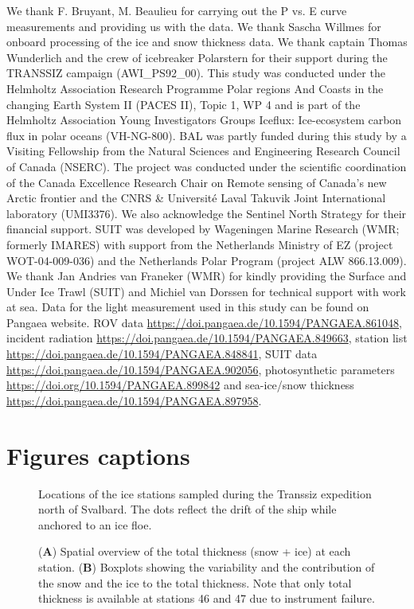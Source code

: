 \documentclass[draft]{agujournal2018}
\begin{document}
We thank F. Bruyant, M. Beaulieu for carrying out the P vs. E curve measurements and providing us with the data. We thank Sascha Willmes for onboard processing of the ice and snow thickness data. We thank captain Thomas Wunderlich and the crew of icebreaker Polarstern for their support during the TRANSSIZ campaign (AWI\_PS92\_00). This study was conducted under the Helmholtz Association Research Programme Polar regions And Coasts in the changing Earth System II (PACES II), Topic 1, WP 4 and is part of the Helmholtz Association Young Investigators Groups Iceflux: Ice-ecosystem carbon flux in polar oceans (VH-NG-800). BAL was partly funded during this study by a Visiting Fellowship from the Natural Sciences and Engineering Research Council of Canada (NSERC). The project was conducted under the scientific coordination of the Canada Excellence Research Chair on Remote sensing of Canada's new Arctic frontier and the CNRS \& Université Laval Takuvik Joint International laboratory (UMI3376). We also acknowledge the Sentinel North Strategy for their financial support. SUIT was developed by Wageningen Marine Research (WMR; formerly IMARES) with support from the Netherlands Ministry of EZ (project WOT-04-009-036) and the Netherlands Polar Program (project ALW 866.13.009). We thank Jan Andries van Franeker (WMR) for kindly providing the Surface and Under Ice Trawl (SUIT) and Michiel van Dorssen for technical support with work at sea. Data for the light measurement used in this study can be found on Pangaea website. ROV data \url{https://doi.pangaea.de/10.1594/PANGAEA.861048}, incident radiation \url{https://doi.pangaea.de/10.1594/PANGAEA.849663}, station list \url{https://doi.pangaea.de/10.1594/PANGAEA.848841}, SUIT data \url{https://doi.pangaea.de/10.1594/PANGAEA.902056}, photosynthetic parameters \url{https://doi.org/10.1594/PANGAEA.899842} and sea-ice/snow thickness \url{https://doi.pangaea.de/10.1594/PANGAEA.897958}.

\section{Figures captions}

\begin{figure}[h]
	\centering
	\caption{Locations of the ice stations sampled during the Transsiz expedition north of Svalbard. The dots reflect the drift of the ship while anchored to an ice floe.}
\end{figure}

\begin{figure}[h]
	\centering
	\caption{(\textbf{A}) Spatial overview of the total thickness (snow + ice) at each station. (\textbf{B}) Boxplots showing the variability and the contribution of the snow and the ice to the total thickness. Note that only total thickness is available at stations 46 and 47 due to instrument failure.}
\end{figure}
\end{document}

